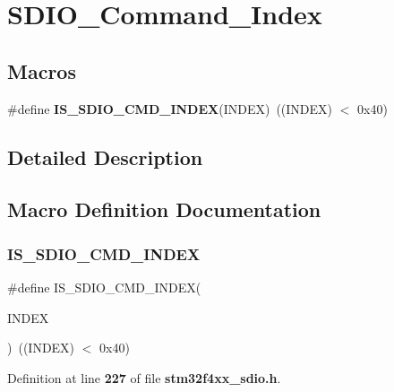 \section{S\+D\+I\+O\+\_\+\+Command\+\_\+\+Index}
\label{group__SDIO__Command__Index}
\subsection*{Macros}
\begin{DoxyCompactItemize}
\item 
\#define \textbf{ I\+S\+\_\+\+S\+D\+I\+O\+\_\+\+C\+M\+D\+\_\+\+I\+N\+D\+EX}(I\+N\+D\+EX)~((I\+N\+D\+EX) $<$ 0x40)
\end{DoxyCompactItemize}


\subsection{Detailed Description}


\subsection{Macro Definition Documentation}
\mbox{\label{group__SDIO__Command__Index_gae988f9f37c4ebb5f5f9866acb30f2880}} 
\subsubsection{I\+S\+\_\+\+S\+D\+I\+O\+\_\+\+C\+M\+D\+\_\+\+I\+N\+D\+EX}
{\footnotesize\ttfamily \#define I\+S\+\_\+\+S\+D\+I\+O\+\_\+\+C\+M\+D\+\_\+\+I\+N\+D\+EX(\begin{DoxyParamCaption}\item[{}]{I\+N\+D\+EX }\end{DoxyParamCaption})~((I\+N\+D\+EX) $<$ 0x40)}



Definition at line \textbf{ 227} of file \textbf{ stm32f4xx\+\_\+sdio.\+h}.

